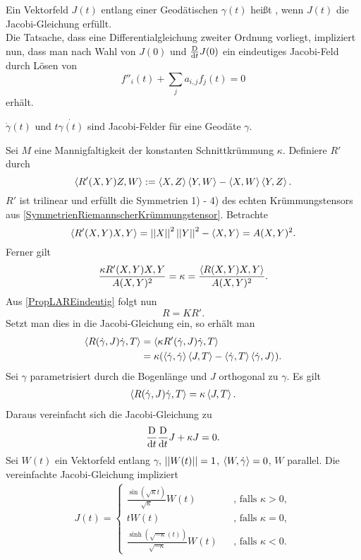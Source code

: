 \Def{}
Ein Vektorfeld $J(t)$ entlang einer Geodätischen $\gamma(t)$ heißt , wenn $J(t)$ die Jacobi-Gleichung erfüllt.\\

Die Tatsache, dass eine Differentialgleichung zweiter Ordnung vorliegt, impliziert nun, dass man nach Wahl von $J(0)$ und $\frac{\text{D}}{\text{d} t}J(0)$ ein eindeutiges Jacobi-Feld durch Lösen von 
\[ f''_i(t) +\sum_j a_{i,j} f_j(t) = 0 \]
erhält.

\Bsp{}
$\dot{\gamma}(t)$ und $t\dot{\gamma(t)}$ sind Jacobi-Felder für eine Geodäte $\gamma$.

Sei $M$ eine Mannigfaltigkeit der konstanten Schnittkrümmung $\kappa$. Definiere $R'$ durch
\[ \left<R'(X,Y)Z, W\right> := \left<X,Z\right> \left<Y,W\right> - \left<X,W\right> \left<Y,Z\right>. \]
$R'$ ist trilinear und erfüllt die Symmetrien 1) - 4) des echten Krümmungstensors aus \ref{SymmetrienRiemannscherKrümmungstensor}. Betrachte
\[ \left<R'(X,Y)X,Y\right> = \left|\left|X\right|\right|^2\left|\left|Y\right|\right|^2 - \left<X,Y\right> = A(X,Y)^2. \]
Ferner gilt
\[ \frac{\kappa R'(X,Y)X,Y}{A(X,Y)^2} = \kappa = \frac{\left< R(X,Y)X,Y \right>}{A(X,Y)^2}. \]
Aus \ref{PropLAREindeutig} folgt nun
\[ R = KR'. \]
Setzt man dies in die Jacobi-Gleichung ein, so erhält man
\begin{align*}
\left<R(\dot{\gamma}, J)\dot{\gamma}, T\right> &= \left<\kappa R'(\dot{\gamma}, J)\dot{\gamma}, T\right>\\
&= \kappa ( \left<\dot{\gamma}, \dot{\gamma}\right> \left<J,T\right> - \left<\dot{\gamma}, T\right> \left<\dot{\gamma}, J\right> ).
\end{align*}
Sei $\gamma$ parametrisiert durch die Bogenlänge und $J$ orthogonal zu $\gamma$. Es gilt
\begin{align*}
\left< R(\dot{\gamma}, J) \dot{\gamma}, T \right> = \kappa \left<J,T\right>.
\end{align*}
Daraus vereinfacht sich die Jacobi-Gleichung zu
\[ \frac{\text{D}}{\text{d} t} \frac{\text{D}}{\text{d} t} J+  \kappa J = 0. \]
Sei $W(t)$ ein Vektorfeld entlang $\gamma$, $\left|\left|W(t)\right|\right| = 1$, $\left<W, \dot{\gamma}\right> = 0$, $W$ parallel. Die vereinfachte Jacobi-Gleichung impliziert
\begin{align*}
J(t) = \left\lbrace
\begin{aligned}
\frac{\sin(\sqrt{\kappa} t)}{\sqrt{\kappa}} W(t) &&\text{, falls }\kappa > 0,\\
t W(t) && \text{, falls }\kappa = 0,\\
\frac{\sinh(\sqrt{-\kappa}(t))}{\sqrt{-\kappa}} W(t) && \text{, falls }\kappa < 0.
\end{aligned}
\right.
\end{align*}